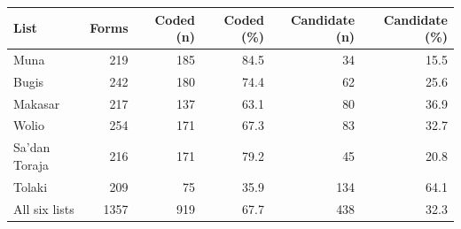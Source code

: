 \begin{tabular}{lrrrrr}
\toprule
List & Forms & Coded (n) & Coded (\%) & Candidate (n) & Candidate (\%) \\
\midrule
Muna & 219 & 185 & 84.5 & 34 & 15.5 \\
Bugis & 242 & 180 & 74.4 & 62 & 25.6 \\
Makasar & 217 & 137 & 63.1 & 80 & 36.9 \\
Wolio & 254 & 171 & 67.3 & 83 & 32.7 \\
Sa'dan Toraja & 216 & 171 & 79.2 & 45 & 20.8 \\
Tolaki & 209 & 75 & 35.9 & 134 & 64.1 \\
\midrule
All six lists & 1357 & 919 & 67.7 & 438 & 32.3 \\
\bottomrule
\end{tabular}
